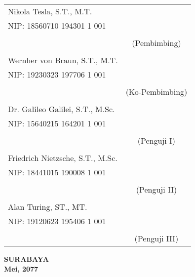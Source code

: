     \noindent
    \begin{tabularx}{\textwidth}{X c}
      Nikola Tesla, S.T., M.T.          & \\
      NIP: 18560710 194301 1 001        & \\
      &  \\                             & (Pembimbing)\\
      &  \\                             
      Wernher von Braun, S.T., M.T.     & \\
      NIP: 19230323 197706 1 001        & \\
      &  \\                             & (Ko-Pembimbing)\\
      &  \\
      Dr. Galileo Galilei, S.T., M.Sc.  & \\
      NIP: 15640215 164201 1 001        & \\
      &  \\                             & (Penguji I)\\
      &  \\
      Friedrich Nietzsche, S.T., M.Sc.  & \\
      NIP: 18441015 190008 1 001        & \\
      &  \\                             & (Penguji II)\\ 
      &  \\
      Alan Turing, ST., MT.             & \\
      NIP: 19120623 195406 1 001        & \\
      & \\                              & (Penguji III)\\
    \end{tabularx}
  \endgroup

  \vspace{4ex}

  \begin{center}
    \textbf{SURABAYA} \\
    \textbf{Mei, 2077}
  \end{center}
\endgroup
